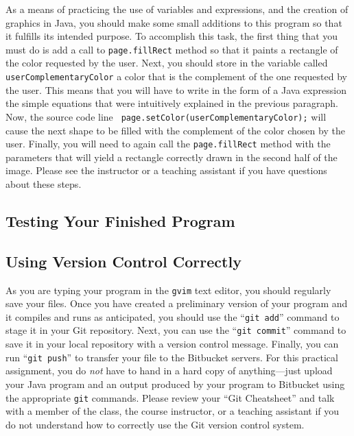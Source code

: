 As a means of practicing the use of variables and expressions, and the creation of graphics in Java, you should make
some small additions to this program so that it fulfills its intended purpose. To accomplish this task, the first thing
that you must do is add a call to {\tt page.fillRect} method so that it paints a rectangle of the color requested by the
user. Next, you should store in the variable called {\tt userComplementaryColor} a color that is the complement of the
one requested by the user. This means that you will have to write in the form of a Java expression the simple equations
that were intuitively explained in the previous paragraph. Now, the source code line {\tt
page.setColor(userComplementaryColor);} will cause the next shape to be filled with the complement of the color chosen
by the user. Finally, you will need to again call the {\tt page.fillRect} method with the parameters that will yield a
rectangle correctly drawn in the second half of the image. Please see the instructor or a teaching assistant if you have
questions about these steps.

\vspace*{-.1in}
\subsection*{Testing Your Finished Program}



\subsection*{Using Version Control Correctly}

As you are typing your program in the {\tt gvim} text editor, you should regularly save your files.  Once you have
created a preliminary version of your program and it compiles and runs as anticipated, you should use the ``{\tt git
add}'' command to stage it in your Git repository.  Next, you can use the ``{\tt git commit}'' command to save it in
your local repository with a version control message.  Finally, you can run ``{\tt git push}'' to transfer your file to
the Bitbucket servers.  For this practical assignment, you do {\em not} have to hand in a hard copy of anything---just
upload your Java program and an output produced by your program to Bitbucket using the appropriate {\tt git} commands.
Please review your ``Git Cheatsheet'' and talk with a member of the class, the course instructor, or a teaching
assistant if you do not understand how to correctly use the Git version control system.


